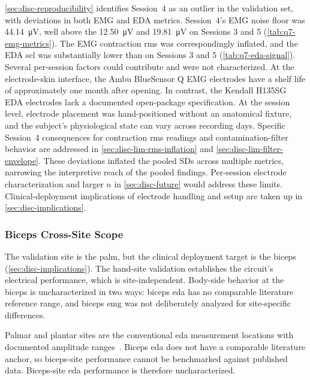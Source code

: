 \autoref{sec:disc-reproducibility} identifies Session~4 as an outlier in the validation set, with deviations in both EMG and EDA metrics. Session~4's EMG noise floor was \SI{44.14}{\micro\volt}, well above the \SI{12.50}{\micro\volt} and \SI{19.81}{\micro\volt} on Sessions 3 and 5 (\autoref{tab:q7-emg-metrics}). The EMG contraction \gls{rms} was correspondingly inflated, and the EDA \gls{scl} was substantially lower than on Sessions 3 and 5 (\autoref{tab:q7-eda-signal}). Several per-session factors could contribute and were not characterized. At the electrode-skin interface, the Ambu BlueSensor Q EMG electrodes have a shelf life of approximately one month after opening. In contrast, the Kendall H135SG EDA electrodes lack a documented open-package specification. At the session level, electrode placement was hand-positioned without an anatomical fixture, and the subject's physiological state can vary across recording days. Specific Session~4 consequences for contraction \gls{rms} readings and contamination-filter behavior are addressed in \autoref{sec:disc-lim-rms-inflation} and \autoref{sec:disc-lim-filter-envelope}. These deviations inflated the pooled SDs across multiple metrics, narrowing the interpretive reach of the pooled findings. Per-session electrode characterization and larger $n$ in \autoref{sec:disc-future} would address these limits. Clinical-deployment implications of electrode handling and setup are taken up in \autoref{sec:disc-implications}.

\subsubsection{Biceps Cross-Site Scope}
\label{sec:disc-lim-biceps}

The validation site is the palm, but the clinical deployment target is the biceps (\autoref{sec:disc-implications}). The hand-site validation establishes the circuit's electrical performance, which is site-independent. Body-side behavior at the biceps is uncharacterized in two ways: biceps \gls{eda} has no comparable literature reference range, and biceps \gls{emg} was not deliberately analyzed for site-specific differences.

Palmar and plantar sites are the conventional \gls{eda} measurement locations with documented amplitude ranges~\cite{boucsein_electrodermal_2012}. Biceps \gls{eda} does not have a comparable literature anchor, so biceps-site performance cannot be benchmarked against published data. Biceps-site \gls{eda} performance is therefore uncharacterized.


